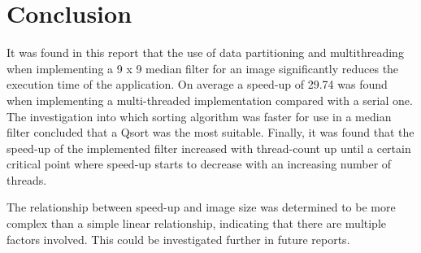 \section{Conclusion}
It was found in this report that the use of data partitioning and multithreading when implementing a 9 x 9 median filter for an image significantly reduces the execution time of the application. On average a speed-up of 29.74 was found when implementing a multi-threaded implementation compared with a serial one. The investigation into which sorting algorithm was faster for use in a median filter concluded that a Qsort was the most suitable. Finally, it was found that the speed-up of the implemented filter increased with thread-count up until a certain critical point where speed-up starts to decrease with an increasing number of threads.

The relationship between speed-up and image size was determined to be more complex than a simple linear relationship, indicating that there are multiple factors involved. This could be investigated further in future reports.

